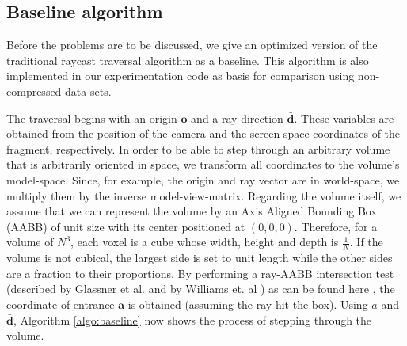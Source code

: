 \subsection{Baseline algorithm}
%
Before the problems are to be discussed, we give an optimized version of the traditional raycast traversal algorithm as a baseline. This algorithm is also implemented in our experimentation code as basis for comparison using non-compressed data sets.

The traversal begins with an origin $\mathbf{o}$ and a ray direction $\mathbf{\bar{d}}$. These variables are obtained from the position of the camera and the screen-space coordinates of the fragment, respectively.  In order to be able to step through an arbitrary volume that is arbitrarily oriented in space, we transform all coordinates to the volume's model-space. Since, for example, the origin and ray vector are in world-space, we multiply them by the inverse model-view-matrix. Regarding the volume itself, we assume that we can represent the volume by an Axis Aligned Bounding Box (AABB) of unit size with its center positioned at $(0,0,0)$. Therefore, for a volume of $N^3$, each voxel is a cube whose width, height and depth is $\frac{1}{N}$. If the volume is not cubical, the largest side is set to unit length while the other sides are a fraction to their proportions. By performing a ray-AABB intersection test (described by Glassner et al. \cite{glassner89} and by Williams et. al \cite{williams05}) as can be found here \cite{barnes11}, the coordinate of entrance $\mathbf{a}$ is obtained (assuming the ray hit the box). Using $a$ and $\mathbf{\bar{d}}$, Algorithm \ref{algo:baseline} now shows the process of stepping through the volume.

